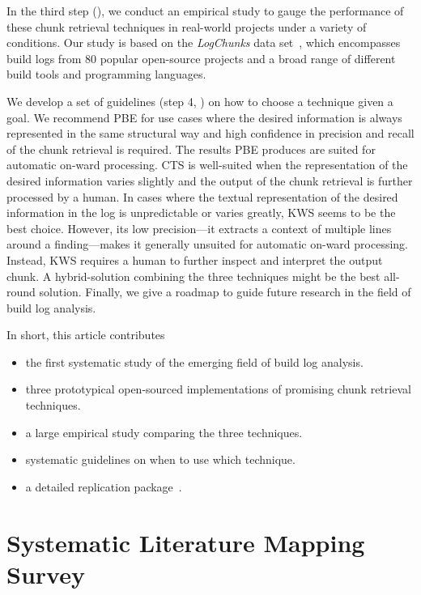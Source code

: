 In the third step (),
we conduct an empirical study to gauge the performance
of these chunk retrieval techniques in
real-world projects under a variety of conditions.
Our study is based on the \emph{LogChunks} data
set~\cite{brandt2020logchunks}, which encompasses build logs from
80 popular open-source projects and a broad range of different
build tools and programming languages.

We develop a set of guidelines (step 4, )
on how to choose a
technique given a goal.
We recommend PBE for use cases where the desired information is always
represented in the same structural way and high confidence in
precision and recall of the chunk retrieval is required.
The results PBE produces are suited for automatic on-ward processing.
CTS is
well-suited when the representation of the desired information varies
slightly and the output of the chunk retrieval is further processed by
a human.
In cases where the textual representation of the desired
information in the log is unpredictable or varies greatly, KWS seems
to be the best choice.
However, its low precision---it extracts a
context of multiple lines around a finding---makes it generally
unsuited for automatic on-ward processing.
Instead, KWS requires a human
to further inspect and interpret the output chunk.
A hybrid-solution combining the three techniques might be the best
all-round solution.
Finally, we give a roadmap to guide future research in the field
of build log analysis.

In short, this article contributes
\begin{itemize}
\item the first systematic study of the emerging field of build log
analysis.
\item three prototypical open-sourced implementations of
promising chunk retrieval techniques.
\item a large empirical study comparing the three techniques.
\item systematic guidelines on when to use which technique.
\item a detailed replication package~\cite{brandt2020chunk-replication}.
\end{itemize}

\section{Systematic Literature Mapping Survey}
\label{sec:survey}

